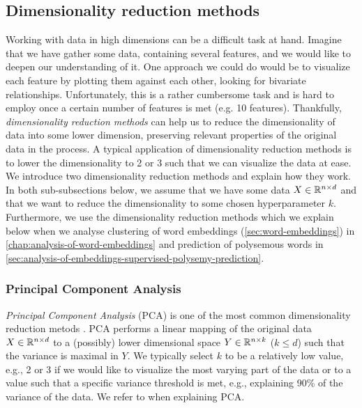 \subsection{Dimensionality reduction methods}
\label{sec:dimensionality-reduction-methods}
Working with data in high dimensions can be a difficult task at hand. Imagine that we have gather some data, containing several features, and we would like to deepen our understanding of it. One approach we could do would be to visualize each feature by plotting them against each other, looking for bivariate relationships. Unfortunately, this is a rather cumbersome task and is hard to employ once a certain number of features is met (e.g. 10 features). Thankfully, \textit{dimensionality reduction methods} can help us to reduce the dimensionality of data into some lower dimension, preserving relevant properties of the original data in the process. A typical application of dimensionality reduction methods is to lower the dimensionality to 2 or 3 such that we can visualize the data at ease. We introduce two dimensionality reduction methods and explain how they work. In both sub-subsections below, we assume that we have some data $X \in \mathbb{R}^{n \times d}$ and that we want to reduce the dimensionality to some chosen hyperparameter $k$. Furthermore, we use the dimensionality reduction methods which we explain below when we analyse clustering of word embeddings (\cref{sec:word-embeddings}) in \cref{chap:analysis-of-word-embeddings} and prediction of polysemous words in \cref{sec:analysis-of-embeddings-supervised-polysemy-prediction}.

\subsubsection{Principal Component Analysis}
\label{sec:pca}
\textit{Principal Component Analysis} (PCA) is one of the most common dimensionality reduction metods \cite{Jolliffe2002}. PCA performs a linear mapping of the original data $X \in \mathbb{R}^{n \times d}$ to a (possibly) lower dimensional space $Y \in \mathbb{R}^{n \times k}$ ($k \leq d$) such that the variance is maximal in $Y$. We typically select $k$ to be a relatively low value, e.g., 2 or 3 if we would like to visualize the most varying part of the data or to a value such that a specific variance threshold is met, e.g., explaining 90\% of the variance of the data. We refer to \cite{Jolliffe2002} when explaining PCA.

